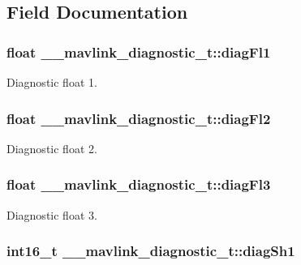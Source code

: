 \subsection{Field Documentation}
\hypertarget{struct____mavlink__diagnostic__t_a7842b0ebcb7962429e6bfca218a3fb84}{
\subsubsection[{diag\+Fl1}]{\setlength{\rightskip}{0pt plus 5cm}float \+\_\+\+\_\+mavlink\+\_\+diagnostic\+\_\+t\+::diag\+Fl1}}\label{struct____mavlink__diagnostic__t_a7842b0ebcb7962429e6bfca218a3fb84}


Diagnostic float 1. 

\hypertarget{struct____mavlink__diagnostic__t_a5aad21402becec9a5635b18f5634dbb1}{
\subsubsection[{diag\+Fl2}]{\setlength{\rightskip}{0pt plus 5cm}float \+\_\+\+\_\+mavlink\+\_\+diagnostic\+\_\+t\+::diag\+Fl2}}\label{struct____mavlink__diagnostic__t_a5aad21402becec9a5635b18f5634dbb1}


Diagnostic float 2. 

\hypertarget{struct____mavlink__diagnostic__t_a56984ef815d3cbef46abcb4ad8f4b5c9}{
\subsubsection[{diag\+Fl3}]{\setlength{\rightskip}{0pt plus 5cm}float \+\_\+\+\_\+mavlink\+\_\+diagnostic\+\_\+t\+::diag\+Fl3}}\label{struct____mavlink__diagnostic__t_a56984ef815d3cbef46abcb4ad8f4b5c9}


Diagnostic float 3. 

\hypertarget{struct____mavlink__diagnostic__t_afe93db87c4f3870a127a05aa2f4d246f}{
\subsubsection[{diag\+Sh1}]{\setlength{\rightskip}{0pt plus 5cm}int16\+\_\+t \+\_\+\+\_\+mavlink\+\_\+diagnostic\+\_\+t\+::diag\+Sh1}}\label{struct____mavlink__diagnostic__t_afe93db87c4f3870a127a05aa2f4d246f}


